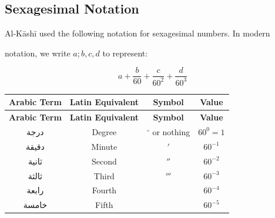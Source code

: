 \documentclass[11pt,a4paper]{article}
\newcommand{\ar}[1]{{\arabicfont\beginR #1\endR}}
\begin{document}
\subsection{Sexagesimal Notation}



Al-K\=ash\=i used the following notation for sexagesimal numbers. In modern

notation, we write $a; b, c, d$ to represent:

\[

a + \frac{b}{60} + \frac{c}{60^2} + \frac{d}{60^3}

\]



\begin{longtable}{|c|c|c|c|}

\hline

\textbf{Arabic Term} & \textbf{Latin Equivalent} & \textbf{Symbol} &

\textbf{Value} \\

\hline

\endfirsthead

\hline

\textbf{Arabic Term} & \textbf{Latin Equivalent} & \textbf{Symbol} &

\textbf{Value} \\

\hline

\endhead

\ar{درجة} & Degree & $^\circ$ or nothing & $60^0 = 1$ \\

\hline

\ar{دقيقة} & Minute & $'$ & $60^{-1}$ \\

\hline

\ar{ثانية} & Second & $''$ & $60^{-2}$ \\

\hline

\ar{ثالثة} & Third & $'''$ & $60^{-3}$ \\

\hline

\ar{رابعة} & Fourth & & $60^{-4}$ \\

\hline

\ar{خامسة} & Fifth & & $60^{-5}$ \\

\hline

\end{longtable}
\end{document}
